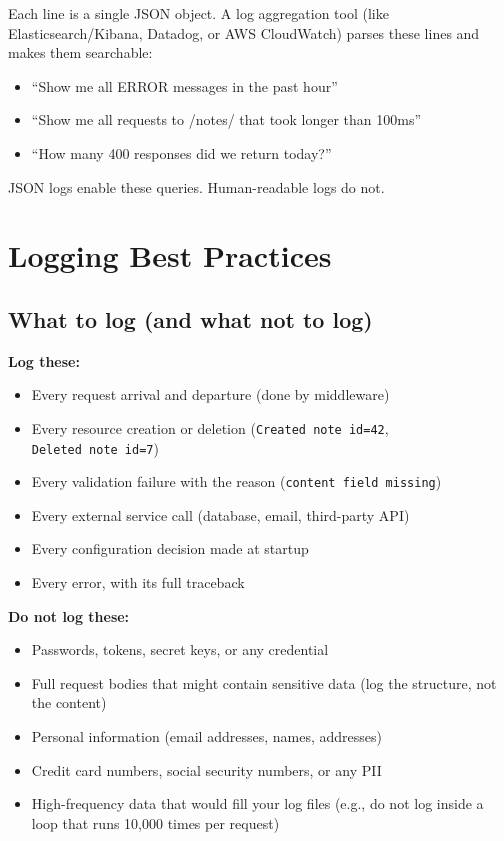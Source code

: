 \noindent{}Each line is a single JSON object. A log aggregation tool (like Elasticsearch/Kibana, Datadog, or AWS CloudWatch) parses these lines and makes them searchable:

\begin{itemize}
\tightlist
\item
  ``Show me all ERROR messages in the past hour''
\item
  ``Show me all requests to /notes/ that took longer than 100ms''
\item
  ``How many 400 responses did we return today?''
\end{itemize}

\noindent{}JSON logs enable these queries. Human-readable logs do not.

\setcounter{section}{8}
\section{Logging Best Practices}\label{16-logging-error-handling:169-logging-best-practices}

\subsection*{What to log (and what not to log)}\label{16-logging-error-handling:what-to-log-and-what-not-to-log}

\textbf{Log these:}

\begin{itemize}
\tightlist
\item
  Every request arrival and departure (done by middleware)
\item
  Every resource creation or deletion (\texttt{Created\ note\ id=}\allowbreak{}\texttt{42}, \texttt{Deleted\ note\ id=7})
\item
  Every validation failure with the reason (\texttt{\textquotesingle{}content\textquotesingle{}\ field\ missing})
\item
  Every external service call (database, email, third-party API)
\item
  Every configuration decision made at startup
\item
  Every error, with its full traceback
\end{itemize}

\noindent{}\textbf{Do not log these:}

\begin{itemize}
\tightlist
\item
  Passwords, tokens, secret keys, or any credential
\item
  Full request bodies that might contain sensitive data (log the structure, not the content)
\item
  Personal information (email addresses, names, addresses)
\item
  Credit card numbers, social security numbers, or any PII
\item
  High-frequency data that would fill your log files (e.g., do not log inside a loop that runs 10,000 times per request)
\end{itemize}

